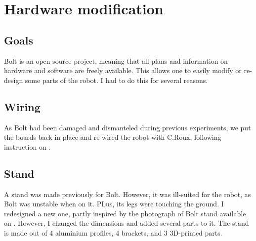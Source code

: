 \documentclass[a4paper,10pt]{article}
\begin{document}
\section{Hardware modification}
\subsection{Goals}
Bolt is an open-source project, meaning that all plans and information on hardware and software are freely available. This allows one to easily modify or re-design some parts of the robot. I had to do this for several reasons.

\subsection{Wiring}
As Bolt had been damaged and dismanteled during previous experiments, we put the boards back in place and re-wired the robot with C.Roux, following instruction on \cite{2}.

\subsection{Stand}
A stand was made previously for Bolt. However, it was ill-suited for the robot, as Bolt was unstable when on it. PLus, its legs were touching the ground. I redesigned a new one, partly inspired by the photograph of Bolt stand available on \cite{2}. However, I changed the dimensions and added several parts to it. The stand is made out of 4 aluminium profiles, 4 brackets, and 3 3D-printed parts.
\end{document}
